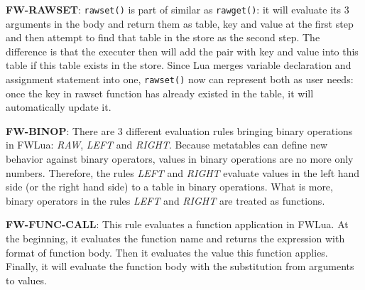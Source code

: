 {\bf FW-RAWSET}: {\tt rawset()} is part of similar as {\tt rawget()}: it will evaluate its 3 arguments in the body and return them as table, key and value at the first step and then attempt to find that table in the store as the second step. The difference is that the executer then will add the pair with key and value into this table if this table exists in the store. Since Lua merges variable declaration and assignment statement into one, {\tt rawset()} now can represent both as user needs: once the key in rawset function has already existed in the table, it will automatically update it.

{\bf FW-BINOP}: There are 3 different evaluation rules bringing binary operations in FWLua: {\it RAW}, {\it LEFT} and {\it RIGHT}. Because metatables can define new behavior against binary operators, values in binary operations are no more only numbers. Therefore, the rules {\it LEFT} and {\it RIGHT} evaluate values in the left hand side (or the right hand side) to a table in binary operations. What is more, binary operators in the rules {\it LEFT} and {\it RIGHT} are treated as functions.

{\bf FW-FUNC-CALL}: This rule evaluates a function application in FWLua. At the beginning, it evaluates the function name and returns the expression with format of function body. Then it evaluates the value this function applies. Finally, it will evaluate the function body with the substitution from arguments to values. 

